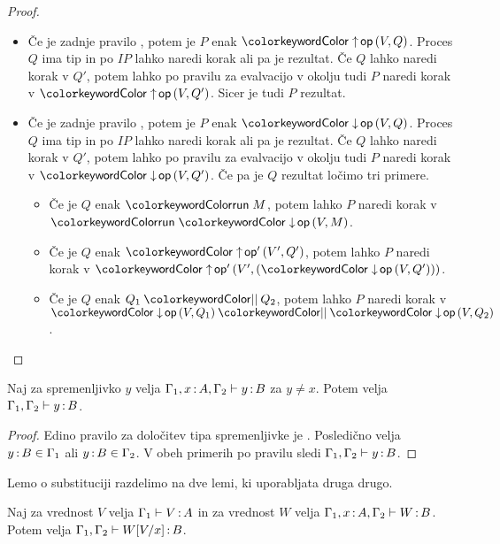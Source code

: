 \begin{proof}
\begin{itemize}
		\item Če je zadnje pravilo , potem je $P$ enak $\tmopout{op}{V}{Q}$. Proces $Q$ ima tip in po $IP$ lahko naredi korak ali pa je rezultat.
		Če $Q$ lahko naredi korak v $Q'$, potem lahko po pravilu za evalvacijo v okolju tudi $P$ naredi korak v $\tmopout{op}{V}{Q'}$.
		Sicer je tudi $P$ rezultat.
		
		\item Če je zadnje pravilo , potem je $P$ enak $\tmopin{op}{V}{Q}$. Proces $Q$ ima tip in po $IP$ lahko naredi korak ali pa je rezultat.
		Če $Q$ lahko naredi korak v $Q'$, potem lahko po pravilu za evalvacijo v okolju tudi $P$ naredi korak v $\tmopin{op}{V}{Q'}$.
		Če pa je $Q$ rezultat ločimo tri primere.
		\begin{itemize}
			\item Če je $Q$ enak $\tmrun{M}$, potem lahko $P$ naredi korak v $\tmrun{\tmopin{op}{V}{M}}$.
			\item Če je $Q$ enak $\tmopout{op'}{V'}{Q'}$, potem lahko $P$ naredi korak v $\tmopout{op'}{V'}{(\tmopin{op}{V}{Q'})}$.
			\item Če je $Q$ enak $\tmpar{Q_1}{Q_2}$, potem lahko $P$ naredi korak v $\tmpar{\tmopin{op}{V}{Q_1}}{\tmopin{op}{V}{Q_2}}$.
		\end{itemize}
		
	\end{itemize}
		
\end{proof}


\begin{lema}\label{lem:strengthening-gamma}
	Naj za spremenljivko $y$ velja $\Gamma_1, x \mathinner{:} A, \Gamma_2 \vdash y \mathinner{:} B$ za $y \neq x$. Potem velja $\Gamma_1, \Gamma_2 \vdash y \mathinner{:} B$.
\end{lema}

\begin{proof}
	Edino pravilo za določitev tipa spremenljivke je . Posledično velja $y \mathinner{:} B \in \Gamma_1$ ali $y \mathinner{:} B \in \Gamma_2$. V obeh primerih po pravilu  sledi $\Gamma_1, \Gamma_2 \vdash y \mathinner{:} B$.
\end{proof}

Lemo o substituciji razdelimo na dve lemi, ki uporabljata druga drugo.

\begin{lema}\label{lem:substitucija-vrednosti}
	Naj za vrednost $V$ velja $\Gamma_1 \vdash V \mathinner{:} A$ in za vrednost $W$ velja $\Gamma_1, x \mathinner{:} A, \Gamma_2 \vdash W \mathinner{:} B$. Potem velja $\Gamma_1, \Gamma_2 \vdash W[V/x] \mathinner{:} B$.
\end{lema}

